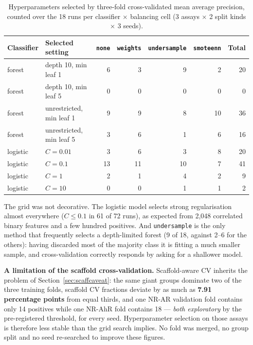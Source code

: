 \documentclass[10pt,letterpaper]{article}
\begin{document}
\begin{table}[!htbp]
\centering
\small
\caption{Hyperparameters selected by three-fold cross-validated mean average precision, counted over
the 18 runs per classifier $\times$ balancing cell (3 assays $\times$ 2 split kinds $\times$ 3 seeds).}
\label{tab:hyper}
\begin{tabular}{@{}llrrrrr@{}}
\toprule
Classifier & Selected setting & \texttt{none} & \texttt{weights} & \texttt{undersample} & \texttt{smoteenn} & Total \\
\midrule
forest & depth 10, min leaf 1 & 6 & 3 & 9 & 2 & 20 \\
forest & depth 10, min leaf 5 & 0 & 0 & 0 & 0 & 0 \\
forest & unrestricted, min leaf 1 & 9 & 9 & 8 & 10 & 36 \\
forest & unrestricted, min leaf 5 & 3 & 6 & 1 & 6 & 16 \\
\midrule
logistic & $C = 0.01$ & 3 & 6 & 3 & 8 & 20 \\
logistic & $C = 0.1$  & 13 & 11 & 10 & 7 & 41 \\
logistic & $C = 1$    & 2 & 1 & 4 & 2 & 9 \\
logistic & $C = 10$   & 0 & 0 & 1 & 1 & 2 \\
\bottomrule
\end{tabular}
\end{table}

The grid was not decorative. The logistic model selects strong regularisation almost everywhere
($C \le 0.1$ in 61 of 72 runs), as expected from 2{,}048 correlated binary features and a few hundred
positives. And \texttt{undersample} is the only method that frequently selects a depth-limited forest
(9 of 18, against 2--6 for the others): having discarded most of the majority class it is fitting a
much smaller sample, and cross-validation correctly responds by asking for a shallower model.

\textbf{A limitation of the scaffold cross-validation.} Scaffold-aware CV inherits the problem of
Section~\ref{sec:scaffcaveat}: the same giant groups dominate two of the three training folds,
scaffold CV fractions deviate by as much as \textbf{7.91 percentage points} from equal thirds, and
one NR-AR validation fold contains only 14 positives while one NR-AhR fold contains 18 --- \emph{both
exploratory} by the pre-registered threshold, for every seed. Hyperparameter selection on those
assays is therefore less stable than the grid search implies. No fold was merged, no group split and
no seed re-searched to improve these figures.
\end{document}

